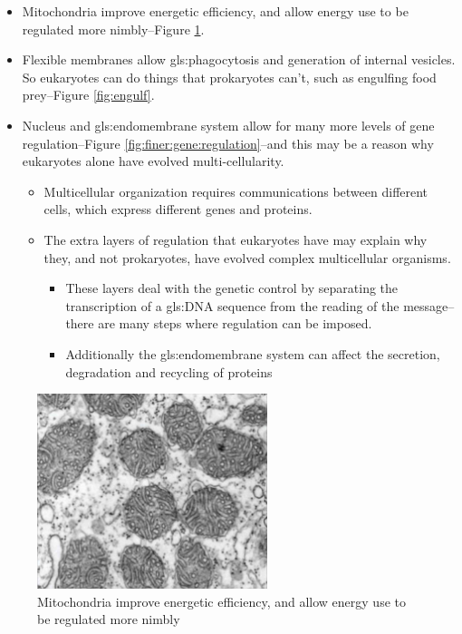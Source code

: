 \documentclass[]{article}
\begin{document}
\begin{itemize}
	\item Mitochondria improve energetic efficiency, and allow energy use to be regulated more nimbly--Figure \ref{fig:EukaryotesMoreEfficient}.
	
	\item Flexible membranes allow \gls{gls:phagocytosis} and generation of internal vesicles. So eukaryotes can do things that prokaryotes can't, such as engulfing food prey--Figure \ref{fig:engulf}.
	
	\item Nucleus and \gls{gls:endomembrane} system allow for many more levels of gene
	regulation--Figure \ref{fig:finer:gene:regulation}--and this may be a reason why eukaryotes alone have evolved multi-cellularity.
	\begin{itemize}
		\item Multicellular organization requires communications between different cells, which express different genes and proteins.
		\item The extra layers of regulation that eukaryotes have may explain why they, and not prokaryotes, have evolved complex multicellular organisms. 
		\begin{itemize}
			\item These layers deal with the genetic control by separating the transcription of a \gls{gls:DNA} sequence from the reading of the message--there are many steps where regulation can be imposed. 
			\item Additionally the \gls{gls:endomembrane} system can affect the secretion, degradation and recycling of proteins
		\end{itemize}
	\end{itemize}
\end{itemize}

\begin{figure}[H]
	\begin{center}
		\caption[Mitochondria improve energetic efficiency]{Mitochondria improve energetic efficiency, and allow energy use to be regulated more nimbly\cite{lane2010energetics}}\label{fig:EukaryotesMoreEfficient}
		\includegraphics[width=0.6\textwidth]{EukaryotesMoreEfficient}
	\end{center}
\end{figure}
\end{document}
